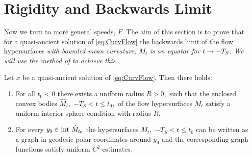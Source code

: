 \documentclass{amsart}
\begin{document}
\section{Rigidity and Backwards Limit}\label{sec:rigidity}
Now we turn to more general speeds, \(F\). The aim of this section is to prove that for a quasi-ancient solution of \eqref{eq:CurvFlow} the backwards limit of the flow hypersurfaces \it{with bounded mean curvature}, $M_t$ is an equator for $t\rightarrow -T_S$. We will use the method of \cite{MakowskiScheuer:/2013} to achieve this.

\begin{lemma}\label{ISC}
Let $x$ be a quasi-ancient solution of \eqref{eq:CurvFlow}. Then there holds:
\begin{enumerate}
  \item For all $t_0<0$ there exists a uniform radius $R>0,$ such that the enclosed convex bodies $\hat{M}_t,$ $-T_S<t\leq t_0,$ of the flow hypersurfaces $M_t$ satisfy a uniform interior sphere condition with radius $R.$
  \item For every $y_0\in\mathrm{int}~\hat{M}_{t_0}$ the hypersurfaces $M_t,$ $-T_S<t\leq t_0$ can be written as a graph in geodesic polar coordinates around $y_0$ and the corresponding graph functions satisfy uniform $C^2$-estimates.
\end{enumerate}
\end{lemma}
\end{document}
